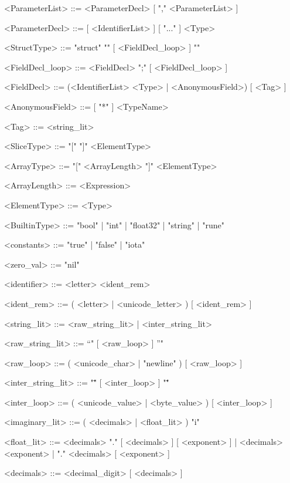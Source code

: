 \begin{grammar}
    <ParameterList>     ::=     <ParameterDecl> [ "," <ParameterList> ]

    <ParameterDecl>     ::=     [ <IdentifierList> ] [ "..." ] <Type>

    <StructType>        ::=     "struct" "{" [ <FieldDecl_loop> ] "}"

    <FieldDecl_loop>    ::=     <FieldDecl> ";" [ <FieldDecl_loop> ]

    <FieldDecl>         ::=     (<IdentifierList> <Type> | <AnonymousField>) [ <Tag> ]

    <AnonymousField>    ::=     [ "*" ] <TypeName>

    <Tag>               ::=     <string_lit>

    <SliceType>         ::=     "[" "]" <ElementType>

    <ArrayType>         ::=     "[" <ArrayLength> "]" <ElementType>

    <ArrayLength>       ::=     <Expression>

    <ElementType>       ::=     <Type>

    <BuiltinType>           ::=     "bool" | "int" | "float32" | "string" | "rune"

    <constants>         ::=     "true" | "false" | "iota"

    <zero_val>          ::=     "nil" 

    <identifier>    ::= <letter> <ident_rem>

    <ident_rem>     ::= ( <letter> | <unicode_letter> ) [ <ident_rem> ]

    <string_lit>        ::=     <raw_string_lit> | <inter_string_lit>

    <raw_string_lit>    ::=     "`" [ <raw_loop> ] "'"

    <raw_loop>          ::=     ( <unicode_char> | "newline" ) [ <raw_loop> ] 

    <inter_string_lit>  ::=     "\"" [ <inter_loop> ] "\""

    <inter_loop>        ::=     ( <unicode_value> | <byte_value> ) [ <inter_loop> ]

    <imaginary_lit>     ::=     ( <decimals> | <float_lit> ) "i"

    <float_lit>         ::=     <decimals> "." [ <decimals> ] [ <exponent> ]
                        |    <decimals> <exponent>
                        |    "." <decimals> [ <exponent> ]

    <decimals>          ::=     <decimal_digit> [ <decimals> ]


\end{grammar}
